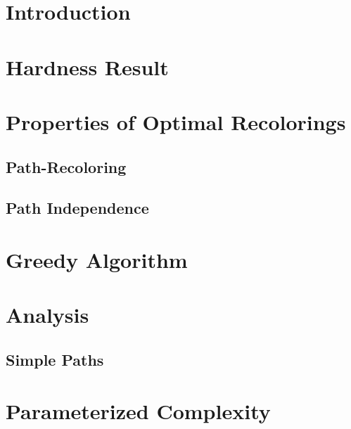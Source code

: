 

\section{Introduction}

	


\section{Hardness Result}



\section{Properties of Optimal Recolorings}

	
	\subsection{Path-Recoloring}
	
	
	\subsection{Path Independence}
	


\section{Greedy Algorithm}


	


\section{Analysis}


	\subsection{Simple Paths}
	

\section{Parameterized Complexity}

